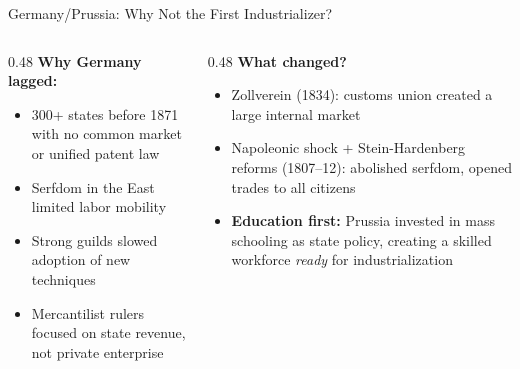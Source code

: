 \documentclass[aspectratio=169, 11pt]{beamer}
\begin{document}

\begin{frame}{Germany/Prussia: Why Not the First Industrializer?}
    \begin{columns}[T]
        \begin{column}{0.48\textwidth}
            \textbf{Why Germany lagged:}
            \begin{itemize}
                \item 300+ states before 1871 with no common market or unified patent law
                \item Serfdom in the East limited labor mobility
                \item Strong guilds slowed adoption of new techniques
                \item Mercantilist rulers focused on state revenue, not private enterprise
            \end{itemize}
        \end{column}
        \begin{column}{0.48\textwidth}
            \textbf{What changed?}
            \begin{itemize}
                \item Zollverein (1834): customs union created a large internal market
                \item Napoleonic shock + Stein-Hardenberg reforms (1807--12): abolished serfdom, opened trades to all citizens
                \item \textbf{Education first:} Prussia invested in mass schooling as state policy, creating a skilled workforce \textit{ready} for industrialization
            \end{itemize}
        \end{column}
    \end{columns}
\end{frame}
\end{document}
